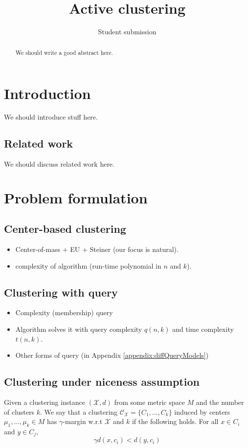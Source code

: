 \documentclass[orivec]{llncs}
\title{Active clustering}
\author{Student submission}
\newcommand{\mc}{\mathcal}
\begin{document}
\maketitle

\begin{abstract}
We should write a good abstract here.
\end{abstract}

\section{Introduction}
We should introduce stuff here.

\subsection{Related work}
We should discuss related work here.


\section{Problem formulation}

\subsection{Center-based clustering}
\begin{itemize}[nolistsep]
\item Center-of-mass + EU + Steiner (our focus is natural).
\item complexity of algorithm (run-time polynomial in $n$ and $k$).
\end{itemize}

\subsection{Clustering with query}
\begin{itemize}[nolistsep]
\item Complexity (membership) query
\item Algorithm solves it with query complexity $q(n, k)$ and time complexity $t(n, k)$.
\item Other forms of query (in Appendix \ref{appendix:diffQueryModels})
\end{itemize}

\subsection{Clustering under niceness assumption}
\begin{definition}
\label{defn:alphacp}
Given a clustering instance $(\mc X, d)$ from some metric space $M$ and the number of clusters $k$. We say that a clustering $\mc C_{\mc X} = \{C_1, \ldots, C_k\}$ induced by centers $\mu_1, \ldots, \mu_k \in M$ has $\gamma$-margin w.r.t $\mc X$ and $k$ if the following holds. For all $x \in C_i$ and $y \in C_j$, 
$$\gamma d(x, c_i) < d(y, c_i)$$
\end{definition}
\end{document}
